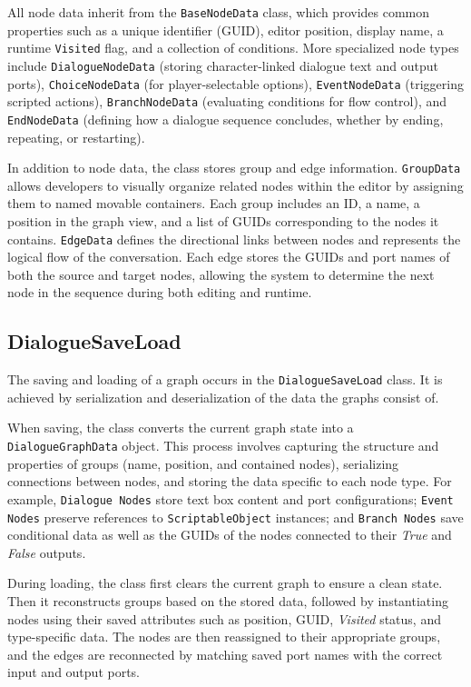 All node data inherit from the \verb|BaseNodeData| class, which provides common properties such as a unique identifier (GUID), editor position, display name, a runtime \verb|Visited| flag, and a collection of conditions. More specialized node types include \verb|DialogueNodeData| (storing character-linked dialogue text and output ports), \verb|ChoiceNodeData| (for player-selectable options), \verb|EventNodeData| (triggering scripted actions), \verb|BranchNodeData| (evaluating conditions for flow control), and \verb|EndNodeData| (defining how a dialogue sequence concludes, whether by ending, repeating, or restarting).

In addition to node data, the class stores group and edge information. \verb|GroupData| allows developers to visually organize related nodes within the editor by assigning them to named movable containers. Each group includes an ID, a name, a position in the graph view, and a list of GUIDs corresponding to the nodes it contains. \verb|EdgeData| defines the directional links between nodes and represents the logical flow of the conversation. Each edge stores the GUIDs and port names of both the source and target nodes, allowing the system to determine the next node in the sequence during both editing and runtime.


\subsection{DialogueSaveLoad}
The saving and loading of a graph occurs in the \verb|DialogueSaveLoad| class. It is achieved by serialization and deserialization of the data the graphs consist of. 

When saving, the class converts the current graph state into a \verb|DialogueGraphData| object. This process involves capturing the structure and properties of groups (name, position, and contained nodes), serializing connections between nodes, and storing the data specific to each node type. For example, \verb|Dialogue Nodes| store text box content and port configurations; \verb|Event Nodes| preserve references to \verb|ScriptableObject| instances; and \verb|Branch Nodes| save conditional data as well as the GUIDs of the nodes connected to their \textit{True} and \textit{False} outputs.

During loading, the class first clears the current graph to ensure a clean state. Then it reconstructs groups based on the stored data, followed by instantiating nodes using their saved attributes such as position, GUID, \textit{Visited} status, and type-specific data. The nodes are then reassigned to their appropriate groups, and the edges are reconnected by matching saved port names with the correct input and output ports.


